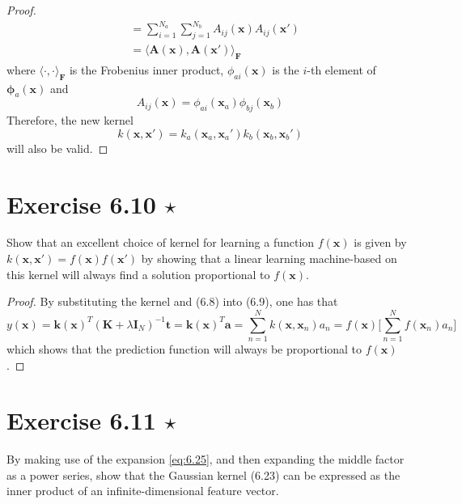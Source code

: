 \begin{proof}
\begin{align*}
        &= \sum_{i=1}^{N_a} \sum_{j=1}^{N_b} A_{ij}(\mathbf{x}) A_{ij}(\mathbf{x}') \\
        &= \langle \mathbf{A}(\mathbf{x}), \mathbf{A}(\mathbf{x}') \rangle_\bm{F}
    \end{align*}
    where $\langle \cdot, \cdot \rangle_\bm{F}$ is the Frobenius inner product,
    $\phi_{ai}(\mathbf{x})$ is the $i$-th element of $\bm{\phi}_a(\mathbf{x})$ and
    \[
        A_{ij}(\mathbf{x}) = \phi_{ai}(\mathbf{x}_a) \phi_{bj}(\mathbf{x}_b)
    \] 
    Therefore, the new kernel
    \begin{equation}\label{eq:6.22}\tag{6.22}
        k(\mathbf{x}, \mathbf{x}') = 
        k_a(\mathbf{x}_a, \mathbf{x}_a') k_b(\mathbf{x}_b, \mathbf{x}_b')
    \end{equation}
    will also be valid.
\end{proof}

\section*{Exercise 6.10 $\star$}
Show that an excellent choice of kernel for learning a function
$f(\mathbf{x})$ is given by $k(\mathbf{x}, \mathbf{x}') = f(\mathbf{x})f(\mathbf{x}')$
by showing that a linear learning machine-based on this kernel will always find a solution
proportional to $f(\mathbf{x})$.

\vspace{1em}

\begin{proof}
    By substituting the kernel and (6.8) into (6.9), one has that
    \[
        y(\mathbf{x}) 
        = \mathbf{k}(\mathbf{x})^T(\mathbf{K} + \lambda \mathbf{I}_N)^{-1} \mathbf{t}
        = \mathbf{k}(\mathbf{x})^T \mathbf{a}
        = \sum_{n=1}^{N} k(\mathbf{x}, \mathbf{x}_n) a_n
        = f(\mathbf{x}) \bigg[\sum_{n=1}^{N} f(\mathbf{x}_n) a_n\bigg]
    \] 
    which shows that the prediction function will always be proportional
    to $f(\mathbf{x})$.
\end{proof}

\section*{Exercise 6.11 $\star$}
By making use of the expansion \eqref{eq:6.25}, and then expanding
the middle factor as a power series, show that the Gaussian kernel
(6.23) can be expressed as the inner product
of an infinite-dimensional feature vector.

\vspace{1em}

